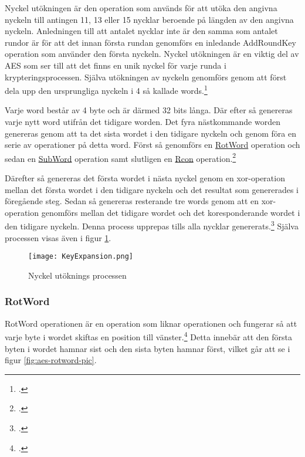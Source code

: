 Nyckel utökningen är den operation som används för att utöka den angivna nyckeln till antingen 11, 13 eller 15 nycklar beroende på längden av den angivna nyckeln.
Anledningen till att antalet nycklar inte är den samma som antalet rundor är för att det innan första rundan genomförs en inledande AddRoundKey operation som använder den första nyckeln.
Nyckel utökningen är en viktig del av AES som ser till att det finns en unik nyckel för varje runda i krypteringsprocessen.
Själva utökningen av nyckeln genomförs genom att först dela upp den ursprungliga nyckeln i 4 så kallade words.\footcite{daemen1999aes}

Varje word består av 4 \gls{byte} och är därmed 32 \gls{bit}s långa.
Där efter så genereras varje nytt word utifrån det tidigare worden. Det fyra nästkommande worden genereras genom att ta det sista wordet i den tidigare nyckeln och genom föra en serie av operationer
på detta word. Först så genomförs en \hyperref[sec:aes-rotword]{RotWord} operation och sedan en \hyperref[sec:aes-subword]{SubWord} operation samt slutligen en \hyperref[sec:aes-rcon]{Rcon} operation.\footcite{daemen1999aes}

Därefter så genereras det första wordet i nästa nyckel genom en \gls{xor}-operation mellan det första wordet i den tidigare nyckeln och det resultat som genererades i föregående steg.
Sedan så genereras resterande tre words genom att en \gls{xor}-operation genomförs mellan det tidigare wordet och det koresponderande wordet i den tidigare nyckeln.
Denna process upprepas tills alla nycklar genererats.\footcite{daemen1999aes} Själva processen visas även i figur \ref{fig:aes-key-expansion-pic}.

\begin{figure}[H]
    \centering
    \texttt{[image: KeyExpansion.png]}
    \caption{Nyckel utöknings processen}
    \label{fig:aes-key-expansion-pic}
\end{figure}

\subsubsection{RotWord}
\label{sec:aes-rotword}

RotWord operationen är en operation som liknar  operationen och fungerar så att varje \gls{byte} i wordet skiftas en position till vänster.\footcite{daemen1999aes}
Detta innebär att den första \gls{byte}n i wordet hamnar sist och den sista \gls{byte}n hamnar först, vilket går att se i figur \ref{fig:aes-rotword-pic}.

